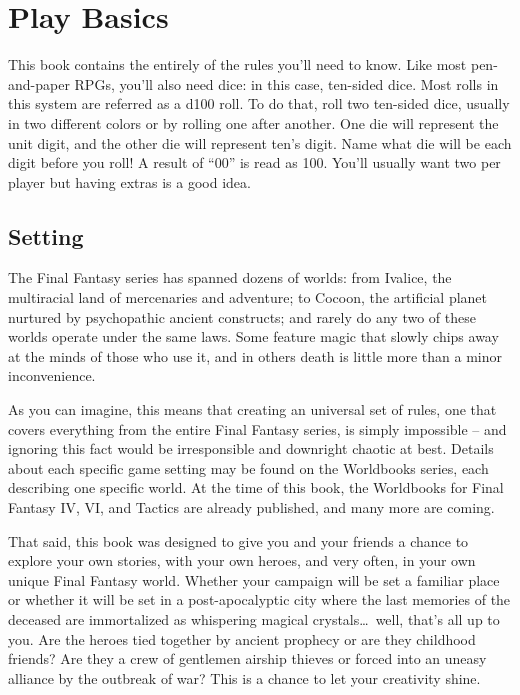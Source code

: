 \section{Play Basics}\label{sec:basics}
\begin{multicols}{2} %
This book contains the entirely of the rules you'll need to know. Like most pen-and-paper RPGs, you'll also need dice: in this case, ten-sided dice. Most rolls in this system are referred as a d100 roll. To do that, roll two ten-sided dice, usually in two different colors or by rolling one after another. One die will represent the unit digit, and the other die will represent ten's digit. Name what die will be each digit before you roll! A result of ``00'' is read as 100. You’ll usually want two per player but having extras is a good idea.
\subsection{Setting}\label{subsec:setting}
The Final Fantasy series has spanned dozens of worlds: from Ivalice, the multiracial land of mercenaries and adventure; to Cocoon, the artificial planet nurtured by psychopathic ancient constructs; and rarely do any two of these worlds operate under the same laws. Some feature magic that slowly chips away at the minds of those who use it, and in others death is little more than a minor inconvenience.

As you can imagine, this means that creating an universal set of rules, one that covers everything from the entire Final Fantasy series, is simply impossible – and ignoring this fact would be irresponsible and downright chaotic at best. Details about each specific game setting may be found on the Worldbooks series, each describing one specific world. At the time of this book, the Worldbooks for Final Fantasy IV, VI, and Tactics are already published, and many more are coming.

That said, this book was designed to give you and your friends a chance to explore your own stories, with your own heroes, and very often, in your own unique Final Fantasy world. Whether your campaign will be set a familiar place or whether it will be set in a post-apocalyptic city where the last memories of the deceased are immortalized as whispering magical crystals\ldots{}\ well, that’s all up to you. Are the heroes tied together by ancient prophecy or are they childhood friends? Are they a crew of gentlemen airship thieves or forced into an uneasy alliance by the outbreak of war? This is a chance to let your creativity shine.

\end{multicols}
